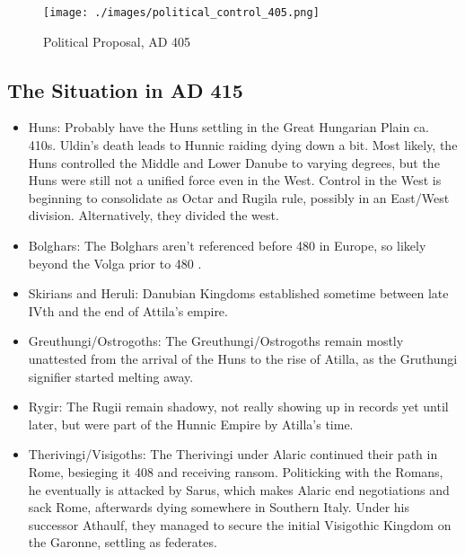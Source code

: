 \documentclass{article}
\begin{document}
	\begin{figure}[h!]
		\centering
		\texttt{[image: ./images/political\_control\_405.png]}
		\caption{Political Proposal, AD 405}
	\end{figure}
	
	\newpage
	\subsection{The Situation in AD 415}
	\label{sec:timeline:subsec:415}
	
	\begin{itemize}
		\item Huns:\newline
		Probably have the Huns settling in the Great Hungarian Plain ca. 410s.
		Uldin's death leads to Hunnic raiding dying down a bit.
		Most likely, the Huns controlled the Middle and Lower Danube to varying degrees, but the Huns were still not a unified force even in the West.
		Control in the West is beginning to consolidate as Octar and Rugila rule, possibly in an East/West division.
		Alternatively, they divided the west.
		
		\item Bolghars:\newline
		The Bolghars aren't referenced before 480 in Europe, so likely beyond the Volga prior to 480 \cite{KimHuns}.
		
		\item Skirians and Heruli:\newline
		Danubian Kingdoms established sometime between late IVth and the end of Attila's empire.
		
		\item Greuthungi/Ostrogoths:\newline
		The Greuthungi/Ostrogoths remain mostly unattested from the arrival of the Huns to the rise of Atilla, as the Gruthungi signifier started melting away.
		
		\item Rygir:\newline
		The Rugii remain shadowy, not really showing up in records yet until later, but were part of the Hunnic Empire by Atilla's time.
		
		\item Therivingi/Visigoths:\newline
		The Therivingi under Alaric continued their path in Rome, besieging it 408 and receiving ransom.
		Politicking with the Romans, he eventually is attacked by Sarus, which makes Alaric end negotiations and sack Rome, afterwards dying somewhere in Southern Italy.
		Under his successor Athaulf, they managed to secure the initial Visigothic Kingdom on the Garonne, settling as federates.
		

\end{itemize}
\end{document}
